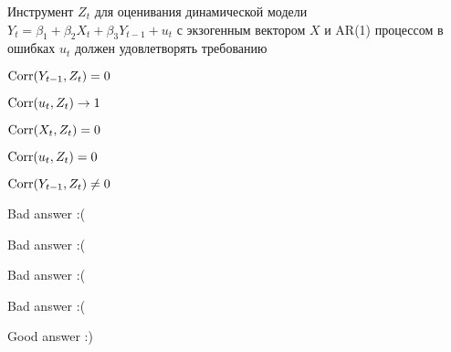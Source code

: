 
\begin{question}
Инструмент \(Z_t\) для оценивания динамической модели \(Y_t = \beta_1 + \beta_2 X_t + \beta_3 Y_{t-1} + u_t\)
с экзогенным вектором \(X\) и AR(1) процессом в ошибках \(u_t\) должен удовлетворять требованию
\begin{answerlist}
  \item \(\operatorname{Corr}(Y_{t-1}, Z_t)=0\)
  \item \(\operatorname{Corr}(u_t, Z_t) \to 1\)
  \item \(\operatorname{Corr}(X_t, Z_t)=0\)
  \item \(\operatorname{Corr}(u_t, Z_t)=0\)
  \item \(\operatorname{Corr}(Y_{t-1}, Z_t) \neq 0\)
\end{answerlist}
\end{question}

\begin{solution}
\begin{answerlist}
  \item Bad answer :(
  \item Bad answer :(
  \item Bad answer :(
  \item Bad answer :(
  \item Good answer :)
\end{answerlist}
\end{solution}

